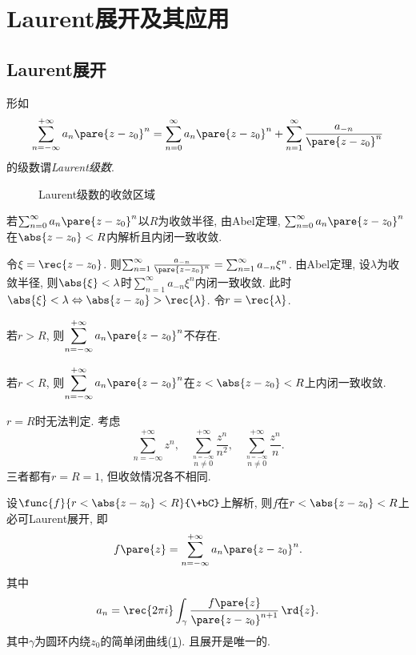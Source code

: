 \documentclass[../ComplexVariable.tex]{subfiles}
\begin{document}
\section{Laurent展开及其应用} %
\label{sec:laurent展开及其应用}

\subsection{Laurent展开} %
\label{sub:laurent展开}

形如
\[ \sum_{n=-\infty}^{+\infty} a_n\pare{z-z_0}^n = \sum_{n=0}^\infty a_n\pare{z-z_0}^n + \sum_{n=1}^\infty \frac{a_{-n}}{\pare{z-z_0}^n} \]
的级数谓\emph{Laurent级数}.
\begin{figure}[ht]
    \centering
    \caption{Laurent级数的收敛区域}
    \label{fig:Laurent级数的收敛区域}
\end{figure}
\begin{cenum}
    \item 若$\sum_{n=0}^\infty a_n\pare{z-z_0}^n$以$R$为收敛半径, 由Abel定理, $\sum_{n=0}^\infty a_n\pare{z-z_0}^n$在$\abs{z-z_0}<R$内解析且内闭一致收敛.
    \item 令$\xi = \displaystyle \rec{z-z_0}$. 则$\sum_{n=1}^\infty \frac{a_{-n}}{\pare{z-z_0}^n} = \sum_{n=1}^\infty a_{-n}\xi^n$. 由Abel定理, 设$\lambda$为收敛半径, 则$\abs{\xi}<\lambda$时$\displaystyle \sum_{n=1}^\infty a_{-n}\xi^n$内闭一致收敛. 此时$\abs{\xi}<\lambda\Leftrightarrow \abs{z-z_0} > \displaystyle \rec{\lambda}$. 令$r = \displaystyle\rec{\lambda}$.
    \item 若$r>R$, 则$\displaystyle \sum_{n=-\infty}^{+\infty} a_n\pare{z-z_0}^n$不存在.
    \item 若$r<R$, 则$\displaystyle \sum_{n=-\infty}^{+\infty} a_n\pare{z-z_0}^n$在$z<\abs{z-z_0}<R$上内闭一致收敛.
    \item $r=R$时无法判定. 考虑
    \[ \sum_{n=-\infty}^{+\infty} z^n,\quad \sum_{\stackrel{\scriptstyle n=-\infty}{n\neq 0}}^{+\infty} \frac{z^n}{n^2},\quad \sum_{\stackrel{\scriptstyle n=-\infty}{n\neq 0}}^{+\infty} \frac{z^n}{n}. \]
    三者都有$r=R=1$, 但收敛情况各不相同.
\end{cenum}
\begin{theorem}
    设$\func{f}{r<\abs{z-z_0}<R}{\+bC}$上解析, 则$f$在$r<\abs{z-z_0}<R$上必可Laurent展开, 即
    \[ f\pare{z} = \sum_{n=-\infty}^{+\infty} a_n\pare{z-z_0}^n. \]
    其中
    \[ a_n = \rec{2\pi i}\int_{\gamma} \frac{f\pare{z}}{\pare{z-z_0}^{n+1}}\,\rd{z}. \]
    其中$\gamma$为圆环内绕$z_0$的简单闭曲线(\cref{fig:Laurent级数的收敛区域}). 且展开是唯一的.
\end{theorem}
\end{document}
